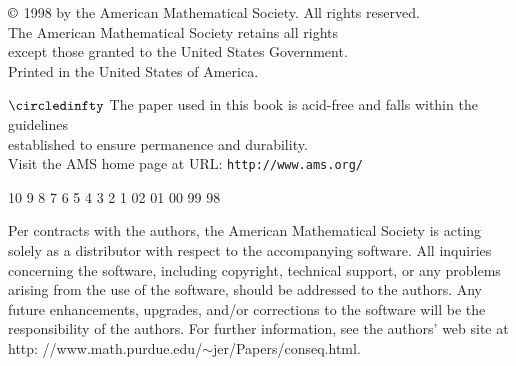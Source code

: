 \begin{copyrightpage}
\begin{center}
$\copyright$ 1998 by the American Mathematical Society. All rights reserved.\\
The American Mathematical Society retains all rights\\
except those granted to the United States Government.\\
Printed in the United States of America.
\end{center}

\begin{center}
$\circledinfty$ The paper used in this book is acid-free and falls within the guidelines\\
 established to ensure permanence and durability.\\
Visit the AMS home page at URL: \texttt{http://www.ams.org/}
\end{center}

\begin{center}
10 9 8 7 6 5 4 3 2 1 02 01 00 99 98
\end{center}

\noindent Per contracts with the authors, the American Mathematical
Society is acting solely as a distributor with respect to the
accompanying software. All inquiries concerning the software,
including copyright, technical support, or any problems arising from
the use of the software, should be addressed to the authors. Any
future enhancements, upgrades, and/or corrections to the software
will be the responsibility of the authors. For further information,
see the authors' web site at http:
//www.math.purdue.edu/$\sim$jer/Papers/conseq.html.
\end{copyrightpage}
